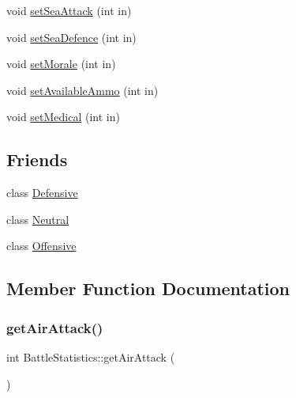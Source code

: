 \begin{DoxyCompactItemize}
\item 
void \mbox{\hyperlink{class_battle_statistics_a554770c20e666f66a77666cd6d69af49}{set\+Sea\+Attack}} (int in)
\item 
void \mbox{\hyperlink{class_battle_statistics_a6f41e9eb9e61e511718cae420ebe6142}{set\+Sea\+Defence}} (int in)
\item 
void \mbox{\hyperlink{class_battle_statistics_aa23a73724ddc3727dc1147f06cbd5d69}{set\+Morale}} (int in)
\item 
void \mbox{\hyperlink{class_battle_statistics_a1a2b9c6388f05cb74337204d242e6413}{set\+Available\+Ammo}} (int in)
\item 
void \mbox{\hyperlink{class_battle_statistics_a7c8b9a07dd588e8a0b74424b9041763f}{set\+Medical}} (int in)
\end{DoxyCompactItemize}
\subsection*{Friends}
\begin{DoxyCompactItemize}
\item 
class \mbox{\hyperlink{class_battle_statistics_aea1aa5721183d797155c34412c80b6d3}{Defensive}}
\item 
class \mbox{\hyperlink{class_battle_statistics_a1e50fffcd64b477eace636316f68f37f}{Neutral}}
\item 
class \mbox{\hyperlink{class_battle_statistics_af0bc9f793f287041b409d8411f817cbd}{Offensive}}
\end{DoxyCompactItemize}


\subsection{Member Function Documentation}
\mbox{\label{class_battle_statistics_a2394b50005d68f9bb1ab1534a3d28412}} 
\subsubsection{\texorpdfstring{getAirAttack()}{getAirAttack()}}
{\footnotesize\ttfamily int Battle\+Statistics\+::get\+Air\+Attack (\begin{DoxyParamCaption}{ }\end{DoxyParamCaption})}

\mbox{\label{class_battle_statistics_a53c3392b80588c4af5758b2c880a3c1b}} 
